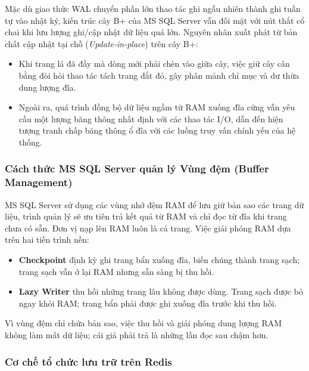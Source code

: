 Mặc dù giao thức WAL chuyển phần lớn thao tác ghi ngẫu nhiên thành ghi tuần tự vào nhật ký, kiến trúc cây B+ của MS SQL Server vẫn đối mặt với nút thắt cổ chai khi lưu lượng ghi/cập nhật dữ liệu quá lớn. Nguyên nhân xuất phát từ bản chất cập nhật tại chỗ (\textit{Update-in-place}) trên cây B+:
\begin{itemize}
    \item Khi trang lá đã đầy mà dòng mới phải chèn vào giữa cây, việc giữ cây cân bằng đòi hỏi thao tác tách trang đắt đỏ, gây phân mảnh chỉ mục và dư thừa dung lượng đĩa.
    \item Ngoài ra, quá trình đồng bộ dữ liệu ngầm từ RAM xuống đĩa cứng vẫn yêu cầu một lượng băng thông nhất định với các thao tác I/O, dẫn đến hiện tượng tranh chấp băng thông ổ đĩa với các luồng truy vấn chính yếu của hệ thống.
\end{itemize}

\subsubsection{Cách thức MS SQL Server quản lý Vùng đệm (Buffer Management)}

MS SQL Server sử dụng các vùng nhớ đệm RAM để lưu giữ bản sao các trang dữ liệu, trình quản lý sẽ ưu tiên trả kết quả từ RAM và chỉ đọc từ đĩa khi trang chưa có sẵn. Đơn vị nạp lên RAM luôn là cả trang. Việc giải phóng RAM dựa trên hai tiến trình nền:
\begin{itemize}
    \item \textbf{Checkpoint} định kỳ ghi trang bẩn xuống đĩa, biến chúng thành trang sạch; trang sạch vẫn ở lại RAM nhưng sẵn sàng bị thu hồi.
    \item \textbf{Lazy Writer} thu hồi những trang lâu không được dùng. Trang sạch được bỏ ngay khỏi RAM; trang bẩn phải được ghi xuống đĩa trước khi thu hồi.
\end{itemize}
Vì vùng đệm chỉ chứa bản sao, việc thu hồi và giải phóng dung lượng RAM không làm mất dữ liệu; cái giá phải trả là những lần đọc sau chậm hơn.
\subsubsection{Cơ chế tổ chức lưu trữ trên Redis}
\label{subsubsec:ds-redis}

